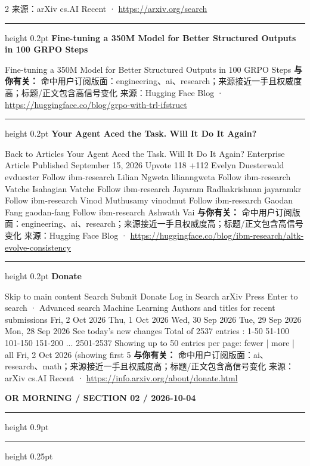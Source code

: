 \documentclass[10.5pt]{ctexart}
\begin{document}
\begin{multicols}{2}
{\footnotesize\color{ormuted} 来源：arXiv cs.AI Recent · \url{https://arxiv.org/search}}
\vspace{2mm}
\hrule height 0.2pt
\vspace{2mm}
{\large\bfseries Fine-tuning a 350M Model for Better Structured Outputs in 100 GRPO Steps}\par
Fine-tuning a 350M Model for Better Structured Outputs in 100 GRPO Steps
\textbf{与你有关：} 命中用户订阅版面：engineering、ai、research；来源接近一手且权威度高；标题/正文包含高信号变化
{\footnotesize\color{ormuted} 来源：Hugging Face Blog · \url{https://huggingface.co/blog/grpo-with-trl-ifstruct}}
\vspace{2mm}
\hrule height 0.2pt
\vspace{2mm}
{\large\bfseries Your Agent Aced the Task. Will It Do It Again?}\par
Back to Articles Your Agent Aced the Task. Will It Do It Again? Enterprise Article Published September 15, 2026 Upvote 118 +112 Evelyn Duesterwald evduester Follow ibm-research Lilian Ngweta lilianngweta Follow ibm-research Vatche Isahagian Vatche Follow ibm-research Jayaram Radhakrishnan jayaramkr Follow ibm-research Vinod Muthusamy vinodmut Follow ibm-research Gaodan Fang gaodan-fang Follow ibm-research Ashwath Vai
\textbf{与你有关：} 命中用户订阅版面：engineering、ai、research；来源接近一手且权威度高；标题/正文包含高信号变化
{\footnotesize\color{ormuted} 来源：Hugging Face Blog · \url{https://huggingface.co/blog/ibm-research/altk-evolve-consistency}}
\vspace{2mm}
\hrule height 0.2pt
\vspace{2mm}
{\large\bfseries Donate}\par
Skip to main content Search Submit Donate Log in Search arXiv Press Enter to search · Advanced search Machine Learning Authors and titles for recent submissions Fri, 2 Oct 2026 Thu, 1 Oct 2026 Wed, 30 Sep 2026 Tue, 29 Sep 2026 Mon, 28 Sep 2026 See today's new changes Total of 2537 entries : 1-50 51-100 101-150 151-200 ... 2501-2537 Showing up to 50 entries per page: fewer | more | all Fri, 2 Oct 2026 (showing first 5
\textbf{与你有关：} 命中用户订阅版面：ai、research、math；来源接近一手且权威度高；标题/正文包含高信号变化
{\footnotesize\color{ormuted} 来源：arXiv cs.AI Recent · \url{https://info.arxiv.org/about/donate.html}}
\end{multicols}
\newpage
{\small\bfseries OR MORNING / SECTION 02 / 2026-10-04}
\vspace{2mm}
\hrule height 0.9pt
\vspace{1.5mm}
\hrule height 0.25pt
\vspace{4mm}
\end{document}

